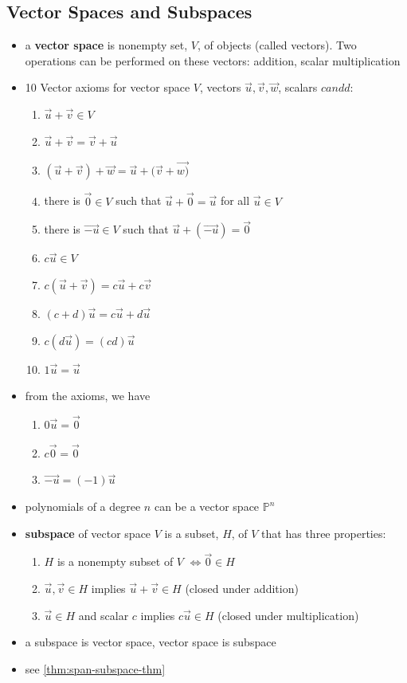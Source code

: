\documentclass[a4paper,12pt]{article}
\theoremstyle{definition}
\theoremstyle{definition}
\begin{document}
	\subsection{Vector Spaces and Subspaces}
	\begin{itemize}
		\item a \textbf{vector space} is nonempty set, $V$, of objects (called vectors). Two operations can be performed on these vectors: addition, scalar multiplication
		
		\item 10 Vector axioms for vector space $V$, vectors $\vec{u}, \vec{v}, \vec{w}$, scalars $c and d$:
		
		\begin{enumerate}
			\item $\vec{u} + \vec{v} \in V$
			\item $\vec{u} + \vec{v} = \vec{v} + \vec{u}$
			\item $(\vec{u} + \vec{v}) + \vec{w} = \vec{u} + (\vec{v} + \vec{w)}$
			\item there is $\vec{0} \in V$ such that $\vec{u} + \vec{0} = \vec{u}$ for all $\vec{u} \in V$
			\item there is $\vec{-u} \in V$ such that $\vec{u} + (\vec{-u}) = \vec{0}$
			\item $c\vec{u} \in V$
			\item $c(\vec{u} + \vec{v}) = c\vec{u} + c\vec{v}$
			\item $(c + d)\vec{u} = c\vec{u} + d\vec{u}$
			\item $c(d\vec{u}) = (cd)\vec{u}$
			\item $1\vec{u} = \vec{u}$
		\end{enumerate}
		
		\item from the axioms, we have
		\begin{enumerate}
			\item $0\vec{u} = \vec{0}$
			\item $c\vec{0} = \vec{0}$
			\item $\vec{-u} = (-1)\vec{u}$
		\end{enumerate}
		
		\item polynomials of a degree $n$ can be a vector space $\mathbb{P}^n$
		
		\item \textbf{subspace} of vector space $V$ is a subset, $H$, of $V$ that has three properties:
		\begin{enumerate}
			\item $H$ is a nonempty subset of $V$ $\Leftrightarrow \vec{0} \in H$
			\item $\vec{u}, \vec{v} \in H$ implies $\vec{u} + \vec{v} \in H$ (closed under addition)
			\item $\vec{u}\in H$ and scalar $c$ implies $c\vec{u} \in H$ (closed under multiplication)
		\end{enumerate}
		
		\item a subspace is vector space, vector space is subspace
		
		\item see \autoref{thm:span-subspace-thm}
	\end{itemize}
	\newpage
	
\end{document}
